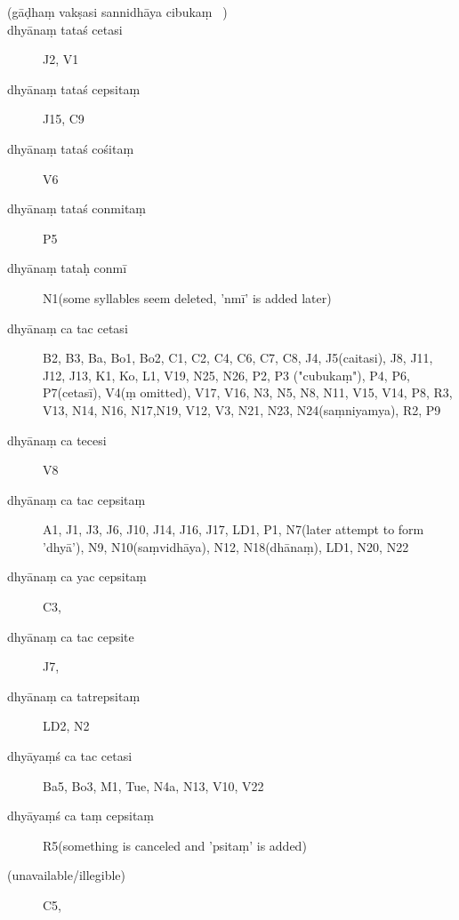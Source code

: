 \begin{ekdosis}
\begin{marma}[hp01_048]
  \begin{description}
\item[(gāḍhaṃ vakṣasi sannidhāya cibukaṃ ~)]
\item[dhyānaṃ tataś cetasi]        J2, V1
\item[dhyānaṃ tataś cepsitaṃ]        J15, C9
\item[dhyānaṃ tataś cośitaṃ]        V6
\item[dhyānaṃ tataś conmitaṃ]        P5
\item[dhyānaṃ tataḥ conmī]        N1(some syllables seem deleted, 'nmī' is added later)
\item[dhyānaṃ ca tac cetasi] B2, B3, Ba, Bo1, Bo2, C1, C2, C4, C6, C7, C8, J4, J5(caitasi), J8,
 J11, J12, J13, K1, Ko, L1, V19, N25, N26, P2, P3 ("cubukaṃ"), P4, P6, P7(cetasī), V4(ṃ omitted),
 V17, V16, N3, N5, N8, N11, V15, V14, P8, R3, V13, N14, N16, N17,N19, V12, V3, N21, N23, N24(saṃniyamya), R2, P9
\item[dhyānaṃ ca tecesi]        V8
\item[dhyānaṃ ca tac cepsitaṃ] A1, J1, J3, J6, J10, J14, J16, J17, LD1, P1, N7(later attempt to form 'dhyā'), N9, N10(saṃvidhāya), N12, N18(dhānaṃ), LD1, N20, N22
\item[dhyānaṃ ca yac cepsitaṃ]        C3,
\item[dhyānaṃ ca tac cepsite]        J7,
\item[dhyānaṃ ca tatrepsitaṃ]        LD2, N2
\item[dhyāyaṃś ca tac cetasi]        Ba5, Bo3, M1, Tue, N4a, N13, V10, V22
\item[dhyāyaṃś ca taṃ cepsitaṃ]        R5(something is canceled and 'psitaṃ' is added)
\item[(unavailable/illegible)]   C5,
        \end{description}


\end{marma}
\end{ekdosis}
